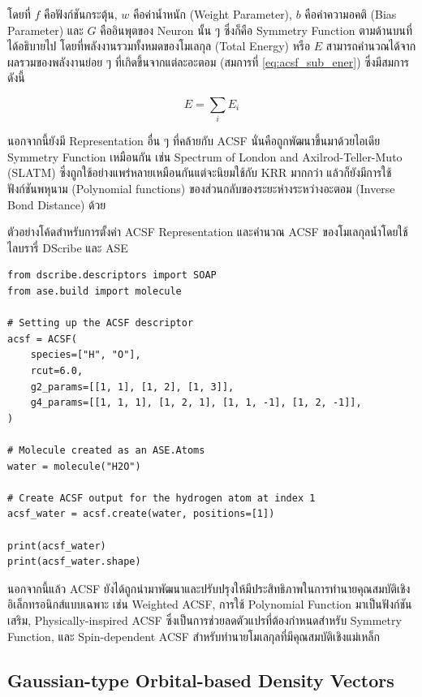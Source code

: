 \noindent โดยที่ $f$ คือฟังก์ชันกระตุ้น, $w$ คือค่าน้ำหนัก (Weight Parameter), $b$ คือค่าความอคติ (Bias Parameter) และ $G$ คืออินพุตของ Neuron นั้น ๆ ซึ่งก็คือ Symmetry Function ตามด้านบนที่ได้อธิบายไป โดยที่พลังงานรวมทั้งหมดของโมเลกุล (Total Energy) หรือ $E$ สามารถคำนวณได้จากผลรวมของพลังงานย่อย ๆ ที่เกิดขึ้นจากแต่ละอะตอม (สมการที่ \eqref{eq:acsf_sub_ener}) ซึ่งมีสมการดังนี้

\begin{equation}
    E = \sum_{i} E_{i}
\end{equation}

นอกจากนี้ยังมี Representation อื่น ๆ ที่คล้ายกับ ACSF นั่นคือถูกพัฒนาขึ้นมาด้วยไอเดีย Symmetry Function เหมือนกัน เช่น Spectrum of London and Axilrod-Teller-Muto (SLATM) ซึ่งถูกใช้อย่างแพร่หลายเหมือนกันแต่จะนิยมใช้กับ KRR มากกว่า\autocite{faber2018,huang2020} แล้วก็ยังมีการใช้ฟังก์ชันพหุนาม (Polynomial functions) ของส่วนกลับของระยะห่างระหว่างอะตอม (Inverse Bond Distance) ด้วย\autocite{kwac2019,musil2021}

ตัวอย่างโค้ดสำหรับการตั้งค่า ACSF Representation และคำนวณ ACSF ของโมเลกุลน้ำโดยใช้ไลบรารี่ DScribe และ ASE

\begin{lstlisting}[style=MyPython]
from dscribe.descriptors import SOAP
from ase.build import molecule

# Setting up the ACSF descriptor
acsf = ACSF(
    species=["H", "O"],
    rcut=6.0,
    g2_params=[[1, 1], [1, 2], [1, 3]],
    g4_params=[[1, 1, 1], [1, 2, 1], [1, 1, -1], [1, 2, -1]],
)

# Molecule created as an ASE.Atoms
water = molecule("H2O")

# Create ACSF output for the hydrogen atom at index 1
acsf_water = acsf.create(water, positions=[1])

print(acsf_water)
print(acsf_water.shape)
\end{lstlisting}

\vspace{1em}

นอกจากนี้แล้ว ACSF ยังได้ถูกนำมาพัฒนาและปรับปรุงให้มีประสิทธิภาพในการทำนายคุณสมบัติเชิงอิเล็กทรอนิกส์แบบเฉพาะ เช่น Weighted ACSF\autocite{gastegger2018}, การใช้ Polynomial Function มาเป็นฟังก์ชันเสริม\autocite{bircher2021}, Physically-inspired ACSF\autocite{zhang2021} ซึ่งเป็นการช่วยลดตัวแปรที่ต้องกำหนดสำหรับ Symmetry Function, และ Spin-dependent ACSF สำหรับทำนายโมเลกุลที่มีคุณสมบัติเชิงแม่เหล็ก\autocite{eckhoff2021}

\subsection{Gaussian-type Orbital-based Density Vectors}
\label{ssec:gauss_orb_den}

